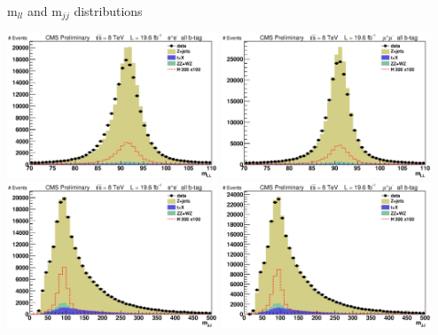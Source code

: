 \begin{frame}{m$_{ll}$ and m$_{jj}$ distributions}
\begin{center}
\includegraphics[width=0.47\textwidth]{images/preselection/el/mLL.eps}
\includegraphics[width=0.47\textwidth]{images/preselection/mu/mLL.eps}\\
\includegraphics[width=0.47\textwidth]{images/preselection/el/mJJ.eps}
\includegraphics[width=0.47\textwidth]{images/preselection/mu/mJJ.eps}\\
\end{center}
\end{frame}

